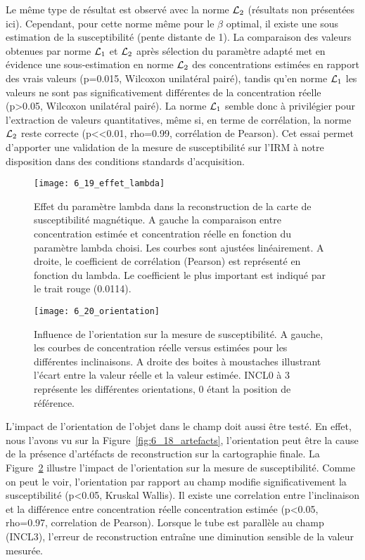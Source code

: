 {Le même type de résultat est observé avec la norme ${\cal L}_2$ (résultats non présentées ici).
Cependant, pour cette norme même pour le $\beta$ optimal, il existe une sous estimation de la susceptibilité
(pente distante de 1). La comparaison des valeurs obtenues par norme ${\cal L}_1$ et ${\cal L}_2$ après sélection du
paramètre adapté met en évidence une sous-estimation en norme ${\cal L}_2$ des concentrations estimées en
rapport des vrais valeurs (p=0.015, Wilcoxon unilatéral pairé), tandis qu’en norme ${\cal L}_1$ les valeurs ne
sont pas significativement différentes de la concentration réelle (p>0.05, Wilcoxon unilatéral pairé). La
norme ${\cal L}_1$ semble donc à privilégier pour l’extraction de valeurs quantitatives, même si, en terme de
corrélation, la norme ${\cal L}_2$ reste correcte (p<<0.01, rho=0.99, corrélation de Pearson). Cet essai permet
d’apporter une validation de la mesure de susceptibilité sur l’IRM à notre disposition dans des
conditions standards d’acquisition.

\begin{figure}[!t]
\centering
\texttt{[image: 6\_19\_effet\_lambda]}
\caption{Effet du paramètre lambda dans la reconstruction de la carte de susceptibilité magnétique. A gauche la
comparaison entre concentration estimée et concentration réelle en fonction du paramètre lambda choisi. Les courbes sont
ajustées linéairement. A droite, le coefficient de corrélation (Pearson) est représenté en fonction du lambda. Le coefficient le
plus important est indiqué par le trait rouge (0.0114).}
\label{fig:6_19_effet_lambda}	
\end{figure}


\begin{figure}[!b]
\centering
\texttt{[image: 6\_20\_orientation]}
\caption{Influence de l'orientation sur la mesure de susceptibilité. A gauche, les courbes de concentration réelle versus
estimées pour les différentes inclinaisons. A droite des boites à moustaches illustrant l'écart entre la valeur réelle et la valeur
estimée. INCL0 à 3 représente les différentes orientations, 0 étant la position de référence.}
\label{fig:6_20_orientation}	
\end{figure}
L’impact de l’orientation de l’objet dans le champ doit aussi être testé. En effet, nous l’avons
vu sur la Figure~\ref{fig:6_18_artefacts}, l’orientation peut être la cause de la présence d’artéfacts de reconstruction sur la
cartographie finale. La Figure~\ref{fig:6_20_orientation} illustre l’impact de l’orientation sur la mesure de susceptibilité.
Comme on peut le voir, l’orientation par rapport au champ modifie significativement la susceptibilité
(p<0.05, Kruskal Wallis). Il existe une correlation entre l’inclinaison et la différence entre concentration
réelle concentration estimée (p<0.05, rho=0.97, correlation de Pearson). Lorsque le tube est parallèle
au champ (INCL3), l’erreur de reconstruction entraîne une diminution sensible de la valeur mesurée.

}
